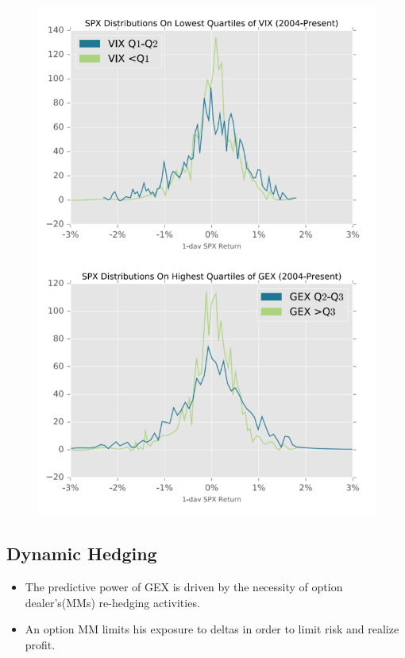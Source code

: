 \documentclass[12pt, oneside]{article}
\begin{document}
\begin{figure}
    \centering
    \includegraphics[width=\textwidth]{1-day SPX Return Vs. GEX_DIX.png}        
\end{figure}

\newpage


\subsection{Dynamic Hedging}
\begin{itemize}
    \item The predictive power of GEX is driven by the necessity of option dealer's(MMs) re-hedging activities.
    \item An option MM limits his exposure to deltas in order to limit risk and realize profit.
\end{itemize}
\end{document}
